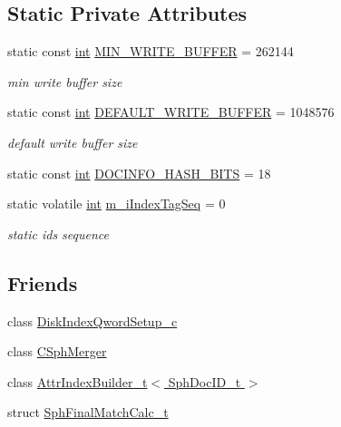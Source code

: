 \subsection*{Static Private Attributes}
\begin{DoxyCompactItemize}
\item 
static const \hyperlink{sphinxexpr_8cpp_a4a26e8f9cb8b736e0c4cbf4d16de985e}{int} \hyperlink{classCSphIndex__VLN_aa3de81463a2b666539e60665c2077b04}{M\-I\-N\-\_\-\-W\-R\-I\-T\-E\-\_\-\-B\-U\-F\-F\-E\-R} = 262144
\begin{DoxyCompactList}\small\item\em min write buffer size \end{DoxyCompactList}\item 
static const \hyperlink{sphinxexpr_8cpp_a4a26e8f9cb8b736e0c4cbf4d16de985e}{int} \hyperlink{classCSphIndex__VLN_a2b58bf32e73d5d143b65b999ae072d97}{D\-E\-F\-A\-U\-L\-T\-\_\-\-W\-R\-I\-T\-E\-\_\-\-B\-U\-F\-F\-E\-R} = 1048576
\begin{DoxyCompactList}\small\item\em default write buffer size \end{DoxyCompactList}\item 
static const \hyperlink{sphinxexpr_8cpp_a4a26e8f9cb8b736e0c4cbf4d16de985e}{int} \hyperlink{classCSphIndex__VLN_afdfbe7daa22bd24cf5d859fe58f55fd9}{D\-O\-C\-I\-N\-F\-O\-\_\-\-H\-A\-S\-H\-\_\-\-B\-I\-T\-S} = 18
\item 
static volatile \hyperlink{sphinxexpr_8cpp_a4a26e8f9cb8b736e0c4cbf4d16de985e}{int} \hyperlink{classCSphIndex__VLN_a44d22f219ec36276ff3af738922b9547}{m\-\_\-i\-Index\-Tag\-Seq} = 0
\begin{DoxyCompactList}\small\item\em static ids sequence \end{DoxyCompactList}\end{DoxyCompactItemize}
\subsection*{Friends}
\begin{DoxyCompactItemize}
\item 
class \hyperlink{classCSphIndex__VLN_ad6703018b80fd3f77d87795858f5e844}{Disk\-Index\-Qword\-Setup\-\_\-c}
\item 
class \hyperlink{classCSphIndex__VLN_a37a49e33cacd6e4719c8ae5d6189d428}{C\-Sph\-Merger}
\item 
class \hyperlink{classCSphIndex__VLN_aef183d615809867ddd9f63f49dd93255}{Attr\-Index\-Builder\-\_\-t$<$ Sph\-Doc\-I\-D\-\_\-t $>$}
\item 
struct \hyperlink{classCSphIndex__VLN_a030d37981a8def95119f9f600e7a5469}{Sph\-Final\-Match\-Calc\-\_\-t}
\end{DoxyCompactItemize}
